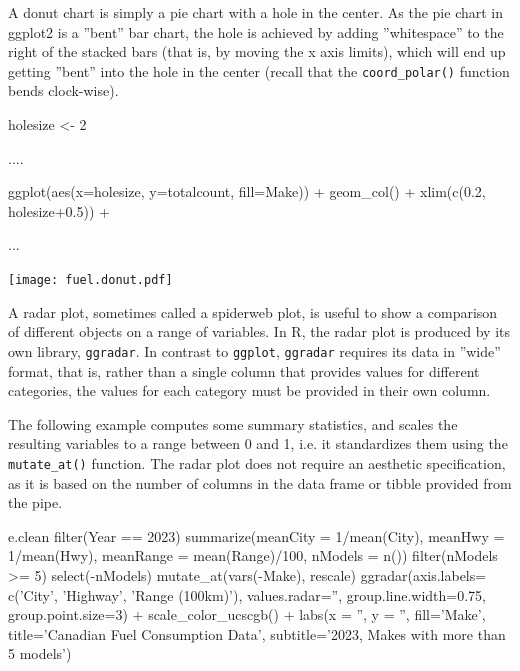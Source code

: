 A donut chart is simply a pie chart with a hole in the center. As the pie chart in ggplot2 is a ''bent'' bar chart, the hole is achieved by adding ''whitespace'' to the right of the stacked bars (that is, by moving the x axis limits), which will end up getting ''bent'' into the hole in the center (recall that the \texttt{coord\_polar()} function bends clock-wise).

\begin{samepage}
\begin{Rcode}
holesize <- 2

....

 ggplot(aes(x=holesize, y=totalcount, fill=Make)) +
   geom_col() + 
   xlim(c(0.2, holesize+0.5)) +
     
...

\end{Rcode}
\end{samepage}

\begin{center}
  \texttt{[image: fuel.donut.pdf]}
\end{center}

A radar plot, sometimes called a spiderweb plot, is useful to show a comparison of different objects on a range of variables. In R, the radar plot is produced by its own library, \texttt{ggradar}. In contrast to \texttt{ggplot}, \texttt{ggradar} requires its data in ''wide'' format, that is, rather than a single column that provides values for different categories, the values for each category must be provided in their own column. 

The following example computes some summary statistics, and scales the resulting variables to a range between 0 and 1, i.e. it standardizes them using the \texttt{mutate\_at()} function. The radar plot does not require an aesthetic specification, as it is based on the number of columns in the data frame or tibble provided from the pipe.

\begin{samepage}
\begin{Rcode}
e.clean %
  filter(Year == 2023) %
  summarize(meanCity = 1/mean(City), 
            meanHwy = 1/mean(Hwy), 
            meanRange = mean(Range)/100, 
            nModels = n()) %
  filter(nModels >= 5) %
  select(-nModels) %
  mutate_at(vars(-Make), rescale) %
  ggradar(axis.labels=
             c('City', 'Highway', 'Range (100km)'), 
          values.radar='', 
          group.line.width=0.75, 
          group.point.size=3) +
  scale_color_ucscgb() +
  labs(x = '', y = '',  fill='Make', 
       title='Canadian Fuel Consumption Data', 
       subtitle='2023, Makes with more than 5 models')
\end{Rcode}
\end{samepage}


